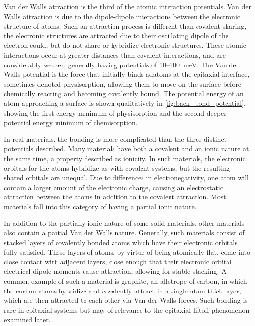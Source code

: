 Van der Walls attraction is the third of the atomic interaction potentials.
Van der Walls attraction is due to the dipole-dipole interactions between the electronic structure of atoms.
Such an attraction process is different than covalent sharing, the electronic structures are attracted due to their oscillating dipole of the electron could, but do not share or hybridize electronic structures.
These atomic interactions occur at greater distances than covalent interactions, and are considerably weaker, generally having potentials of 10--100~meV\@. The Van der Walls potential is the force that initially binds adatoms at the epitaxial interface, sometimes denoted physisorption, allowing them to move on the surface before chemically reacting and becoming covalently bound.
The potential energy of an atom approaching a surface is shown qualitatively in \cref{fig:back_bond_potential}, showing the first energy minimum of physisorption and the second deeper potential energy minimum of chemisorption.

In real materials, the bonding is more complicated than the three distinct potentials described.
Many materials have both a covalent and an ionic nature at the same time, a property described as ionicity.
In such materials, the electronic orbitals for the atoms hybridize as with covalent systems, but the resulting shared orbitals are unequal.
Due to differences in electronegativity, one atom will contain a larger amount of the electronic charge, causing an electrostatic attraction between the atoms in addition to the covalent attraction.
Most materials fall into this category of having a partial ionic nature.

In addition to the partially ionic nature of some solid materials, other materials also contain a partial Van der Walls nature.
Generally, such materials consist of stacked layers of covalently bonded atoms which have their electronic orbitals fully satisfied.
These layers of atoms, by virtue of being atomically flat, come into close contact with adjacent layers, close enough that their electronic orbital electrical dipole moments cause attraction, allowing for stable stacking.
A common example of such a material is graphite, an allotrope of carbon, in which the carbon atoms hybridize and covalently attract in a single atom thick layer, which are then attracted to each other via Van der Walls forces.
Such bonding is rare in epitaxial systems but may of relevance to the epitaxial liftoff phenomenon examined later.


